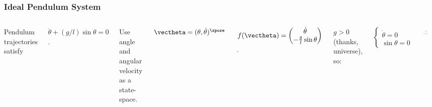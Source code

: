 \documentclass[12pt]{beamer}
\begin{document}
\begin{frame}
\frametitle{Ideal Pendulum System}

\begin{columns}


Pendulum trajectories satisfy

$\ddot\theta + (g/l) \sin \theta = 0$.

Use angle and angular velocity as a state-space.

$\vectheta = (\theta, \dot \theta)^\xpose$

$f(\vectheta)
	= \begin{pmatrix}
		\dot\theta \\
		-\frac{g}{l} \sin\theta
	\end{pmatrix}$.
	
$g > 0$ (thanks, universe), so:

\[
\begin{cases}
\dot\theta = 0 \\
\sin \theta = 0
\end{cases}
\]


\begin{center}
\includegraphics[width=\linewidth]{pic/Simple_gravity_pendulum.png}
\end{center}

\end{columns}

\end{frame}
\end{document}
